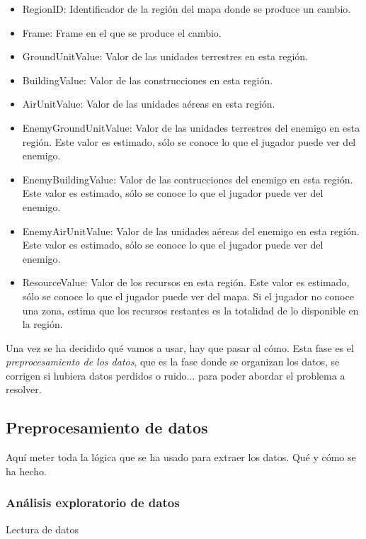 \documentclass[a4paper,11pt]{book}\usepackage[]{graphicx}\usepackage[]{color}
\theoremstyle{plain}
\theoremstyle{definition}
\begin{document}
\begin{itemize}
\begin{itemize}
    \item RegionID: Identificador de la región del mapa donde se produce un cambio.
    \item Frame: Frame en el que se produce el cambio.
    \item GroundUnitValue: Valor de las unidades terrestres en esta región.
    \item BuildingValue: Valor de las construcciones en esta región.
    \item AirUnitValue: Valor de las unidades aéreas en esta región.
    \item EnemyGroundUnitValue: Valor de las unidades terrestres del enemigo en esta región.
    Este valor es estimado, sólo se conoce lo que el jugador puede ver del enemigo.
    \item EnemyBuildingValue: Valor de las contrucciones del enemigo en esta región.
    Este valor es estimado, sólo se conoce lo que el jugador puede ver del enemigo.
    \item EnemyAirUnitValue: Valor de las unidades aéreas del enemigo en esta región.
    Este valor es estimado, sólo se conoce lo que el jugador puede ver del enemigo.
    \item ResourceValue: Valor de los recursos en esta región. Este valor es estimado,
    sólo se conoce lo que el jugador puede ver del mapa. Si el jugador no conoce una zona, estima que los recursos restantes es la totalidad de lo disponible en la región.
  \end{itemize}
\end{itemize}

Una vez se ha decidido qué vamos a usar, hay que pasar al cómo. Esta fase es el \emph{preprocesamiento de los datos}, que es la fase donde se organizan los datos, se corrigen si hubiera datos perdidos o ruido... para poder abordar el problema a resolver.

\subsection{Preprocesamiento de datos}

Aquí meter toda la lógica que se ha usado para extraer los datos. Qué y cómo se ha hecho.

\subsubsection{Análisis exploratorio de datos}

Lectura de datos
\end{document}
